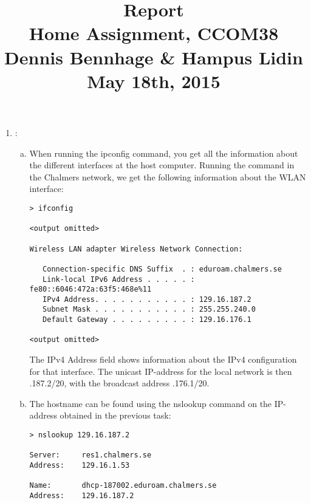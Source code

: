 \documentclass[a4paper,9pt,fleqn]{article}
\title{
{\bf Report}\\
\vspace{0.2cm}
%
Home Assignment, CCOM38\\
\vspace{1cm}
%
{\large Dennis Bennhage \& Hampus Lidin}\\
\vspace{10cm}
%
May 18th, 2015
}
\date{}
\begin{document}
\maketitle

\newpage

\begin{enumerate}[{Task} 1]
\item :
\begin{enumerate}[a)]
\item 
When running the {\outp ipconfig} command, you get all the
information about the different interfaces at the host computer. Running the
command in the Chalmers network, we get the following information
about the WLAN interface:
			
\begin{lstlisting}
> ifconfig

<output omitted>

Wireless LAN adapter Wireless Network Connection:

   Connection-specific DNS Suffix  . : eduroam.chalmers.se
   Link-local IPv6 Address . . . . . : fe80::6046:472a:63f5:468e%11
   IPv4 Address. . . . . . . . . . . : 129.16.187.2
   Subnet Mask . . . . . . . . . . . : 255.255.240.0
   Default Gateway . . . . . . . . . : 129.16.176.1

<output omitted>
\end{lstlisting}

The {\outp IPv4 Address} field shows information about the IPv4 configuration for that
interface. The unicast IP-address for the local network is then {.187.2/20},
with the broadcast address {.176.1/20}.

    
\item 
The hostname can be found using the {\outp nslookup} command on the IP-address
obtained in the previous task:

\begin{lstlisting}
> nslookup 129.16.187.2

Server:		res1.chalmers.se
Address:	129.16.1.53

Name:		dhcp-187002.eduroam.chalmers.se
Address:	129.16.187.2
\end{lstlisting}


\end{enumerate}
\end{enumerate}
\end{document}
